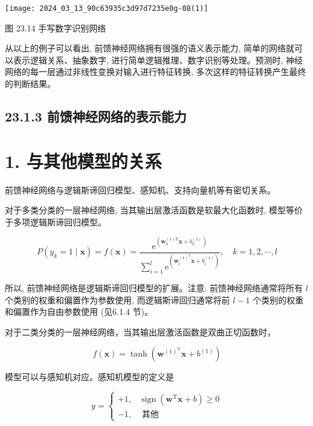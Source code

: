 \documentclass[10pt]{article}
\begin{document}
\begin{CJK*}{UTF8}{bsmi}
\begin{center}
\texttt{[image: 2024\_03\_13\_90c63935c3d97d7235e0g-08(1)]}
\end{center}

图 23.14 手写数字识别网络

从以上的例子可以看出, 前馈神经网络拥有很强的语义表示能力, 简单的网络就可以表示逻辑关系、抽象数字, 进行简单逻辑推理、数字识别等处理。预测时, 神经网络的每一层通过非线性变换对输入进行特征转换, 多次这样的特征转换产生最终的判断结果。

\subsection*{23.1.3 前馈神经网络的表示能力}
\section*{1. 与其他模型的关系}
前馈神经网络与逻辑斯谛回归模型、感知机、支持向量机等有密切关系。

对于多类分类的一层神经网络, 当其输出层激活函数是软最大化函数时, 模型等价于多项逻辑斯谛回归模型。


\begin{equation*}
P\left(y_{k}=1 \mid \boldsymbol{x}\right)=f(\boldsymbol{x})=\frac{\mathrm{e}^{\left(\boldsymbol{w}_{k}^{(1) \mathrm{T}} \boldsymbol{x}+b_{k}^{(1)}\right)}}{\sum_{i=1}^{l} \mathrm{e}^{\left(\boldsymbol{w}_{i}^{(1)^{\mathrm{T}}} \boldsymbol{x}+b_{i}^{(1)}\right)}}, \quad k=1,2, \cdots, l \tag{23.26}
\end{equation*}


所以, 前馈神经网络是逻辑斯谛回归模型的扩展。注意: 前馈神经网络通常将所有 $l$ 个类别的权重和偏置作为参数使用, 而逻辑斯谛回归通常将前 $l-1$ 个类别的权重和偏置作为自由参数使用 (见6.1.4 节)。

对于二类分类的一层神经网络，当其输出层激活函数是双曲正切函数时，


\begin{equation*}
f(\boldsymbol{x})=\tanh \left(\boldsymbol{w}^{(1)^{\mathrm{T}}} \boldsymbol{x}+b^{(1)}\right) \tag{23.27}
\end{equation*}


模型可以与感知机对应。感知机模型的定义是

$$
y= \begin{cases}+1, & \operatorname{sign}\left(\boldsymbol{w}^{\mathrm{T}} \boldsymbol{x}+b\right) \geqslant 0 \\ -1, & \text { 其他 }\end{cases}
$$


\end{CJK*}
\end{document}
